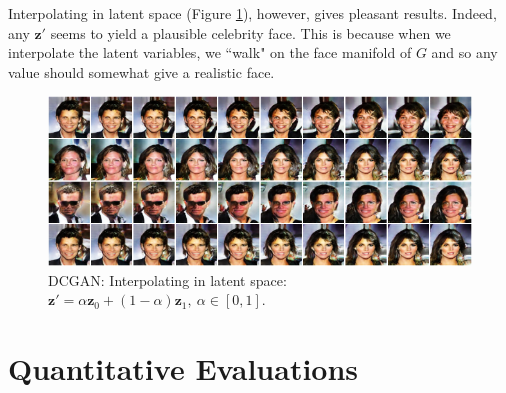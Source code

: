 \documentclass[table]{article}
\def\*#1{\mathbf{#1}}
\begin{document}
Interpolating in latent space (Figure \ref{latent_lerp}), however, gives pleasant results. Indeed, any $\*z'$ seems to yield a plausible celebrity face. This is because when we interpolate the latent variables, we ``walk" on the face manifold of $G$ and so any value should somewhat give a realistic face.


\begin{figure}[ht]
  \centering
  \includegraphics[width=\textwidth]{imgs/gan_latent_lerp}
  \caption{DCGAN: Interpolating in latent space: $\*z' = \alpha \*z_0 + (1-\alpha)\*z_1, \ \alpha \in [0,1]$.}
  \label{latent_lerp}
\end{figure}

\section{Quantitative Evaluations}
\end{document}
